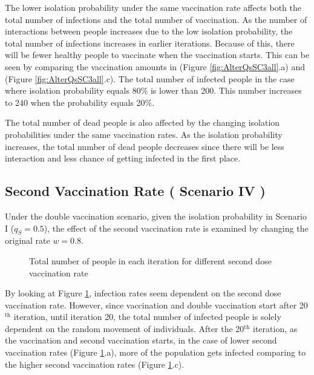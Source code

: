 \documentclass{article}
\begin{document}
The lower isolation probability under the same vaccination rate affects both the total number of infections and the total number of vaccination. As the number of interactions between people increases due to the low isolation probability, the total number of infections increases in earlier iterations. Because of this, there will be fewer healthy people to vaccinate when the vaccination starts. This can be seen by comparing the vaccination amounts in (Figure \ref{fig:AlterQsSC3all}.a) and (Figure \ref{fig:AlterQsSC3all}.c). The total number of infected people in the case where isolation probability equals 80\% is lower than 200. This number increases to 240 when the probability equals 20\%.

The total number of dead people is also affected by the changing isolation probabilities under the same vaccination rates. As the isolation probability increases, the total number of dead people decreases since there will be less interaction and less chance of getting infected in the first place.

\subsection*{Second Vaccination Rate ( Scenario IV )}
\; \; Under the double vaccination scenario, given the isolation probability in Scenario I ($q_S=0.5$), the effect of the second vaccination rate is examined by changing the original rate $w=0.8$.

\begin{figure}[h]
    \centering
    \qquad
    \qquad
    \caption{Total number of people in each iteration for different second dose vaccination rate}
    \label{fig:AlterSC4}%
\end{figure}

By looking at Figure \ref{fig:AlterSC4}, infection rates seem dependent on the second dose vaccination rate. However, since vaccination and double vaccination start after 20$^{\textrm{th}}$ iteration, until iteration 20, the total number of infected people is solely dependent on the random movement of individuals. After the 20$^{\textrm{th}}$ iteration, as the vaccination and second vaccination starts, in the case of lower second vaccination rates (Figure \ref{fig:AlterSC4}.a), more of the population gets infected comparing to the higher second vaccination rates (Figure \ref{fig:AlterSC4}.c).
\end{document}

